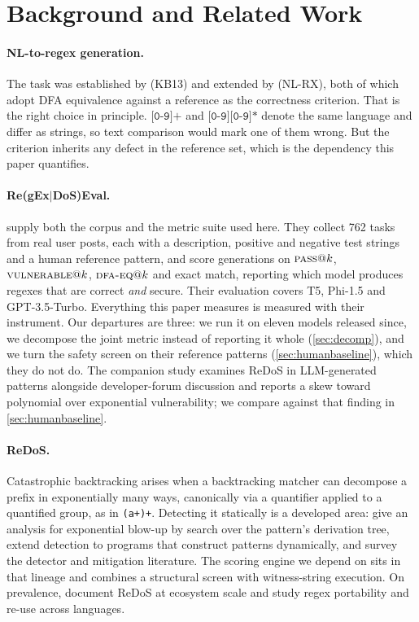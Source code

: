 \documentclass[11pt]{article}
\newcommand{\pass}{\textsc{pass}}
\newcommand{\vuln}{\textsc{vulnerable}}
\newcommand{\dfaeq}{\textsc{dfa-eq}}
\begin{document}
\section{Background and Related Work}

\paragraph{NL-to-regex generation.}
The task was established by \citet{kushman2013semantic} (KB13) and extended
by \citet{locascio2016neural} (NL-RX), both of which adopt DFA equivalence
against a reference as the correctness criterion. That is the right choice in principle. $\texttt{[0-9]+}$ and
$\texttt{[0-9][0-9]*}$ denote the same language and differ as strings, so
text comparison would mark one of them wrong. But the criterion inherits any
defect in the reference set, which is the dependency this paper quantifies.

\paragraph{Re(gEx$|$DoS)Eval.}
\citet{siddiq2024regexeval} supply both the corpus and the metric suite used
here. They collect 762 tasks from real user posts, each with a description,
positive and negative test strings and a human reference pattern, and score
generations on $\pass{}@k$, $\vuln{}@k$, $\dfaeq{}@k$ and exact match,
reporting which model produces regexes that are correct \emph{and} secure.
Their evaluation covers T5, Phi-1.5 and GPT-3.5-Turbo. Everything this paper
measures is measured with their instrument. Our departures are three: we run
it on eleven models released since, we decompose the joint metric instead of
reporting it whole (\cref{sec:decomp}), and we turn the safety screen on
their reference patterns (\cref{sec:humanbaseline}), which they do not do.
The companion study \citep{siddiq2024redos} examines ReDoS in LLM-generated
patterns alongside developer-forum discussion and reports a skew toward
polynomial over exponential vulnerability; we compare against that finding
in \cref{sec:humanbaseline}.

\paragraph{ReDoS.}
Catastrophic backtracking arises when a backtracking matcher can decompose a
prefix in exponentially many ways, canonically via a quantifier applied to a
quantified group, as in \texttt{(a+)+}. Detecting it statically is a
developed area: \citet{kirrage2013static} give an analysis for exponential
blow-up by search over the pattern's derivation tree,
\citet{wustholz2017static} extend detection to programs that construct
patterns dynamically, and \citet{sok2025redos} survey the detector and
mitigation literature. The scoring engine we depend on
\citep{regexbench} sits in that lineage and combines a structural screen with
witness-string execution. On prevalence, \citet{davis2018redos} document
ReDoS at ecosystem scale and \citet{davis2019linguafranca} study regex
portability and re-use across languages.
\end{document}
